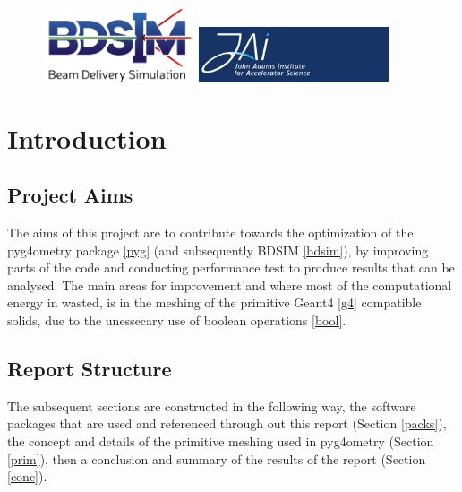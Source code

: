 \documentclass[12pt,a4paper]{article}
\begin{document}
\begin{titlepage}
\begin{figure}[h]
\centering
\begin{minipage}{.6\textwidth}
  \includegraphics[width=0.4\textwidth]{Images//Logos//BDSIM_Logo.jpg}
\end{minipage}%
\begin{minipage}{.6\textwidth}
  \centering
  \includegraphics[width=0.5\textwidth]{Images//Logos//JAI_Logo.jpeg}
  \end{minipage}
\end{figure}

\end{titlepage}
\leavevmode\thispagestyle{empty}\newpage
\tableofcontents
\thispagestyle{empty}
\newpage
\onecolumn

\small
\setcounter{page}{1}


\section{Introduction}

\subsection{Project Aims}
The aims of this project are to contribute towards the optimization of the pyg4ometry package \ref{pyg} (and subsequently BDSIM \ref{bdsim}), by improving parts of the code and conducting performance test to produce results that can be analysed. The main areas for improvement and where most of the computational energy in wasted, is in the meshing of the primitive Geant4 \ref{g4} compatible solids, due to the unessecary use of boolean operations \ref{bool}.

\subsection{Report Structure}
The subsequent sections are constructed in the following way, the software packages that are used and referenced through out this report (Section \ref{packs}), the concept and details of the primitive meshing used in pyg4ometry (Section \ref{prim}), then a conclusion and summary of the results of the report (Section \ref{conc}).
\end{document}
